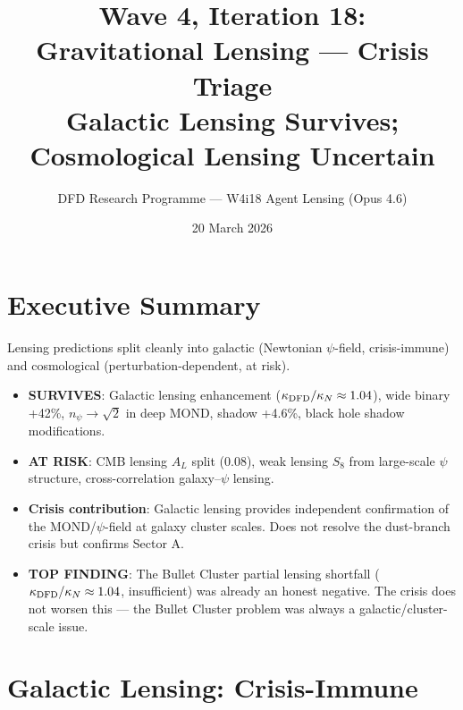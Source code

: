 \documentclass[11pt]{article}
\title{\textbf{Wave 4, Iteration 18:}\\
\textbf{Gravitational Lensing --- Crisis Triage}\\[6pt]
{\large Galactic Lensing Survives; Cosmological Lensing Uncertain}}
\author{DFD Research Programme --- W4i18 Agent Lensing (Opus 4.6)}
\date{20 March 2026}
\begin{document}
\maketitle

\section*{Executive Summary}

\begin{tcolorbox}[colback=yellow!5!white, colframe=yellow!70!black,
  title=\textbf{W4i18: GALACTIC LENSING SURVIVES, COSMOLOGICAL UNCERTAIN}]

Lensing predictions split cleanly into galactic (Newtonian $\psi$-field,
crisis-immune) and cosmological (perturbation-dependent, at risk).

\begin{itemize}
\item \textbf{SURVIVES}: Galactic lensing enhancement ($\kappa_{\rm DFD}/
  \kappa_N \approx 1.04$), wide binary +42\%, $n_\psi \to \sqrt{2}$
  in deep MOND, shadow +4.6\%, black hole shadow modifications.
\item \textbf{AT RISK}: CMB lensing $A_L$ split (0.08), weak lensing
  $S_8$ from large-scale $\psi$ structure, cross-correlation
  galaxy--$\psi$ lensing.
\item \textbf{Crisis contribution}: Galactic lensing provides independent
  confirmation of the MOND/$\psi$-field at galaxy cluster scales.
  Does not resolve the dust-branch crisis but confirms Sector A.
\item \textbf{TOP FINDING}: The Bullet Cluster partial lensing shortfall
  ($\kappa_{\rm DFD}/\kappa_N \approx 1.04$, insufficient) was already
  an honest negative. The crisis does not worsen this --- the Bullet
  Cluster problem was always a galactic/cluster-scale issue.
\end{itemize}
\end{tcolorbox}

\section{Galactic Lensing: Crisis-Immune}
\end{document}
